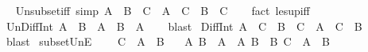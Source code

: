 \begin{isabellebody}
\endisatagproof
{\isafoldproof}%
%
\isadelimproof
%
\endisadelimproof
\ \isanewline
\isanewline
{}\isamarkupfalse%
\ Un{\isacharunderscore}{\kern0pt}subset{\isacharunderscore}{\kern0pt}iff\ {\isacharbrackleft}{\kern0pt}simp{\isacharbrackright}{\kern0pt}{\isacharcolon}{\kern0pt}\ {\isachardoublequoteopen}A\ {\isasymunion}\ B\ {\isasymsubseteq}\ C\ {\isasymlongleftrightarrow}\ A\ {\isasymsubseteq}\ C\ {\isasymand}\ B\ {\isasymsubseteq}\ C{\isachardoublequoteclose}\isanewline
%
\isadelimproof
\ \ %
\endisadelimproof
%
\isatagproof
{}\isamarkupfalse%
\ {\isacharparenleft}{\kern0pt}fact\ le{\isacharunderscore}{\kern0pt}sup{\isacharunderscore}{\kern0pt}iff{\isacharparenright}{\kern0pt}%
\endisatagproof
{\isafoldproof}%
%
\isadelimproof
\isanewline
%
\endisadelimproof
\isanewline
{}\isamarkupfalse%
\ Un{\isacharunderscore}{\kern0pt}Diff{\isacharunderscore}{\kern0pt}Int{\isacharcolon}{\kern0pt}\ {\isachardoublequoteopen}{\isacharparenleft}{\kern0pt}A\ {\isacharminus}{\kern0pt}\ B{\isacharparenright}{\kern0pt}\ {\isasymunion}\ {\isacharparenleft}{\kern0pt}A\ {\isasyminter}\ B{\isacharparenright}{\kern0pt}\ {\isacharequal}{\kern0pt}\ A{\isachardoublequoteclose}\isanewline
%
\isadelimproof
\ \ %
\endisadelimproof
%
\isatagproof
{}\isamarkupfalse%
\ blast%
\endisatagproof
{\isafoldproof}%
%
\isadelimproof
\isanewline
%
\endisadelimproof
\isanewline
{}\isamarkupfalse%
\ Diff{\isacharunderscore}{\kern0pt}Int{}{\isacharcolon}{\kern0pt}\ {\isachardoublequoteopen}A\ {\isasyminter}\ C\ {\isacharminus}{\kern0pt}\ B\ {\isasyminter}\ C\ {\isacharequal}{\kern0pt}\ A\ {\isasyminter}\ C\ {\isacharminus}{\kern0pt}\ B{\isachardoublequoteclose}\isanewline
%
\isadelimproof
\ \ %
\endisadelimproof
%
\isatagproof
{}\isamarkupfalse%
\ blast%
\endisatagproof
{\isafoldproof}%
%
\isadelimproof
\isanewline
%
\endisadelimproof
\isanewline
{}\isamarkupfalse%
\ subset{\isacharunderscore}{\kern0pt}UnE{\isacharcolon}{\kern0pt}\ \isanewline
\ \ \ {\isachardoublequoteopen}C\ {\isasymsubseteq}\ A\ {\isasymunion}\ B{\isachardoublequoteclose}\isanewline
\ \ \ A{\isacharprime}{\kern0pt}\ B{\isacharprime}{\kern0pt}\ \ {\isachardoublequoteopen}A{\isacharprime}{\kern0pt}\ {\isasymsubseteq}\ A{\isachardoublequoteclose}\ {\isachardoublequoteopen}B{\isacharprime}{\kern0pt}\ {\isasymsubseteq}\ B{\isachardoublequoteclose}\ {\isachardoublequoteopen}C\ {\isacharequal}{\kern0pt}\ A{\isacharprime}{\kern0pt}\ {\isasymunion}\ B{\isacharprime}{\kern0pt}{\isachardoublequoteclose}\isanewline

\end{isabellebody}
